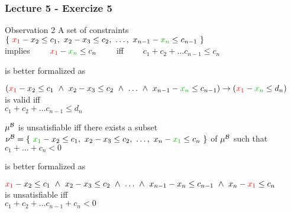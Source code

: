 \begin{frame}
  \frametitle{Lecture 5 - Exercize 5}

  \scriptsize

  \begin{exampleblock}{Observation 2}
    A set of constraints \\
    $\{\ \colone{x_1} - x_2 \leq c_1,\ x_2 - x_3 \leq c_2,\ \ldots,\ x_{n-1} - \coltwo{x_n} \leq c_{n-1}\ \}$ \\
    implies 
    $\quad\quad\colone{x_1} - \coltwo{x_n} \leq c_n\quad\quad$ 
    iff 
    $\quad\quad c_1 + c_2 + \ldots c_{n-1} \leq c_n$
  \end{exampleblock}

  \vfill
  is better formalized as
  \vfill

  \begin{center}
  $(\colone{x_1} - x_2 \leq c_1\ \wedge\ x_2 - x_3 \leq c_2\ \wedge\ \ldots\ \wedge\ x_{n-1} - \coltwo{x_n} \leq c_{n-1}) \rightarrow (\colone{x_1} - \coltwo{x_n} \leq d_n)$ \\
  is valid iff \\
  $c_1 + c_2 + \ldots c_{n-1} \leq d_n$
  \end{center}

  \begin{lemma}
    $\mu^{\mathcal{B}}$ is unsatisfiable iff there exists a subset 
    $\babst{\nu} = \{\ \coltwo{x_1} - x_2 \leq c_1,\ x_2 - x_3 \leq c_2,\ \ldots,\ x_n - \coltwo{x_1} \leq c_n\ \}$ of $\mu^{\mathcal{B}}$
    such that $c_1 + \ldots + c_n < 0$
  \end{lemma}

  \vfill
  is better formalized as
  \vfill

  \begin{center}
  $\colone{x_1} - x_2 \leq c_1\ \wedge\ x_2 - x_3 \leq c_2\ \wedge\ \ldots\ \wedge\ x_{n-1} - x_n \leq c_{n-1}\ \wedge\ x_n - \colone{x_1} \leq c_n$ \\
  is unsatisfiable iff \\
  $c_1 + c_2 + \ldots c_{n-1} + c_n < 0$
  \end{center}

\end{frame}


